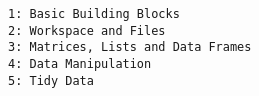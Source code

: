 \documentclass[12pt,article]{article}
\begin{document}
\large
\begin{verbatim}
1: Basic Building Blocks
2: Workspace and Files
3: Matrices, Lists and Data Frames
4: Data Manipulation
5: Tidy Data
\end{verbatim}
\end{document}
